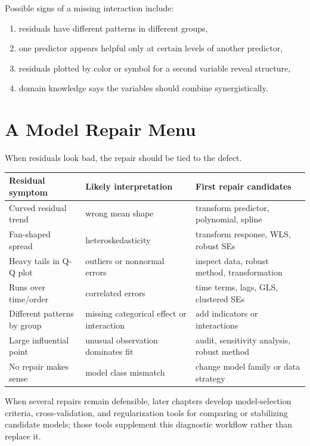 Possible signs of a missing interaction include:
\begin{enumerate}
  \item residuals have different patterns in different groups,
  \item one predictor appears helpful only at certain levels of another predictor,
  \item residuals plotted by color or symbol for a second variable reveal structure,
  \item domain knowledge says the variables should combine synergistically.
\end{enumerate}

\section{A Model Repair Menu}

When residuals look bad, the repair should be tied to the defect.

\begin{center}
\begin{tabular}{p{}p{}p{}}
\toprule
Residual symptom & Likely interpretation & First repair candidates \\
\midrule
Curved residual trend & wrong mean shape & transform predictor, polynomial, spline \\
Fan-shaped spread & heteroskedasticity & transform response, WLS, robust SEs \\
Heavy tails in Q-Q plot & outliers or nonnormal errors & inspect data, robust method, transformation \\
Runs over time/order & correlated errors & time terms, lags, GLS, clustered SEs \\
Different patterns by group & missing categorical effect or interaction & add indicators or interactions \\
Large influential point & unusual observation dominates fit & audit, sensitivity analysis, robust method \\
No repair makes sense & model class mismatch & change model family or data strategy \\
\bottomrule
\end{tabular}
\end{center}

When several repairs remain defensible, later chapters develop model-selection criteria, cross-validation, and regularization tools for comparing or stabilizing candidate models; those tools supplement this diagnostic workflow rather than replace it.

